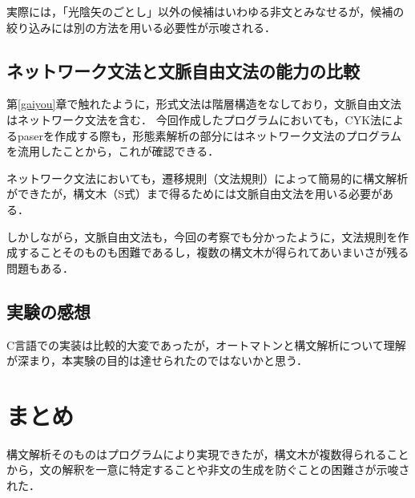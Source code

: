 \documentclass[uplatex, dvipdfmx, a4paper, twocolumn]{jsarticle}
\begin{document}
    実際には，「光陰矢のごとし」以外の候補はいわゆる非文とみなせるが，候補の絞り込みには別の方法を用いる必要性が示唆される．

    \subsection{ネットワーク文法と文脈自由文法の能力の比較}
    第\ref{gaiyou}章で触れたように，形式文法は階層構造をなしており，文脈自由文法はネットワーク文法を含む．
    今回作成したプログラムにおいても，CYK法によるpaserを作成する際も，形態素解析の部分にはネットワーク文法のプログラムを流用したことから，これが確認できる．

    ネットワーク文法においても，遷移規則（文法規則）によって簡易的に構文解析ができたが，構文木（S式）まで得るためには文脈自由文法を用いる必要がある．

    しかしながら，文脈自由文法も，今回の考察でも分かったように，文法規則を作成することそのものも困難であるし，複数の構文木が得られてあいまいさが残る問題もある．

    \subsection{実験の感想}
    C言語での実装は比較的大変であったが，オートマトンと構文解析について理解が深まり，本実験の目的は達せられたのではないかと思う．

  \section{まとめ}\label{matome}
  構文解析そのものはプログラムにより実現できたが，構文木が複数得られることから，文の解釈を一意に特定することや非文の生成を防ぐことの困難さが示唆された．

  
  \flushcolsend

  \onecolumn
  \appendix
  \clearpage
\end{document}
